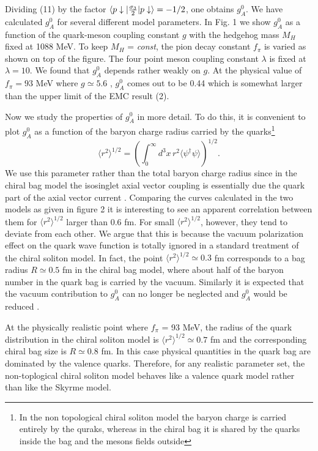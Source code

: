 Dividing (11) by the factor $\langle p \downarrow \vert
{\sigma _3 \over 2} \vert p \downarrow \rangle = - 1/2$, one obtains
$g_A^0$.  We have calculated $g_A^0$ for several different
model parameters.   In
Fig. 1 we show $g_A^0$ as a function of the quark-meson coupling constant
$g$ with the hedgehog mass $M_H$ fixed at 1088 MeV.  To keep
$M_H$ = {\em const}, the pion decay constant $f_\pi$
is varied as shown on top
of the figure.  The four point meson coupling constant $\lambda$ is
fixed
at $\lambda = 10$.  We found that $g_A^0$ depends rather weakly on
$g$.  At the physical value of
$f_\pi = 93$ MeV where $g \simeq 5.6$ ,  $g_A^0$ comes out to be 0.44
which is somewhat larger than the upper limit of the EMC result (2).

Now we study the properties of $g_A^0$ in more detail.  To do this, it is
convenient to plot $g_A^0$ as a function of the baryon charge radius      
carried by the quarks\footnote{In the non topological chiral soliton model
the baryon charge is carried entirely by the quraks, whereas in the chiral
bag it is shared by the quarks inside the bag and the mesons fields outside}
\begin{equation}
\langle r^2 \rangle ^{1/2}  =
( \int _0^\infty d^3x \, r^2 \langle \psi ^\dagger \psi \rangle )^{1/2}.
\end{equation}
We use this parameter rather than the total baryon charge radius
since in the chiral bag model the isosinglet axial vector coupling
is essentially due the quark part of the  axial vector current \cite{PH}.
Comparing the curves calculated in the two models as given in figure 2 it
is interesting to see an apparent correlation between them 
for $\langle r^2 \rangle^{1/2}$ larger than 0.6 fm.  For small
$\langle r^2 \rangle ^{1/2}$,  however,
they tend to deviate from each other.  We argue that this is because the
vacuum polarization effect \cite{KS}
 on the quark wave function is totally
ignored in a standard treatment of the chiral soliton model.
In fact, the point $\langle r^2 \rangle ^{1/2} \simeq 0.3$ fm corresponds
to a bag radius $R \simeq 0.5$ fm in the chiral bag model, where about
half of the baryon number in the quark bag
is carried by the vacuum. Similarly it is expected that
the vacuum contribution to $g_A^0$ can
no longer be neglected and $g_A^0$ would be reduced \cite{W}.

At the physically realistic point where $f_\pi$ = 93 MeV, the radius of the 
quark distribution in the chiral soliton model
is $\langle r^2 \rangle ^{1/2} \simeq 0.7$ fm and the
corresponding chiral bag size is $R \simeq 0.8$ fm. In this case
physical quantities in the quark bag are dominated by the valence
quarks. Therefore, for any realistic parameter set, the non-toplogical
chiral soliton
model behaves like a valence quark model rather than like the Skyrme model.

